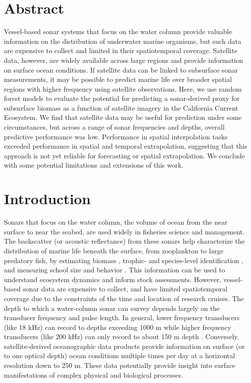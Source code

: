 \documentclass[10pt,letterpaper]{article}
\begin{document}
\section*{Abstract}
Vessel-based sonar systems that focus on the water column provide valuable information on the distribution of underwater marine organisms, but such data are expensive to collect and limited in their spatiotemporal coverage.
Satellite data, however, are widely available across large regions and provide information on surface ocean conditions.
If satellite data can be linked to subsurface sonar measurements, it may be possible to predict marine life over broader spatial regions with higher frequency using satellite observations.
Here, we use random forest models to evaluate the potential for predicting a sonar-derived proxy for subsurface biomass as a function of satellite imagery in the California Current Ecosystem.
We find that satellite data may be useful for prediction under some circumstances, but across a range of sonar frequencies and depths, overall predictive performance was low.
Performance in spatial interpolation tasks exceeded performance in spatial and temporal extrapolation, suggesting that this approach is not yet reliable for forecasting or spatial extrapolation.
We conclude with some potential limitations and extensions of this work.

\linenumbers

\section*{Introduction}

Sonars that focus on the water column, the volume of ocean from the near surface to near the seabed, are used widely in fisheries science and management.
The backscatter (or acoustic reflectance) from these sonars help characterize the distribution of marine life beneath the surface, from zooplankton to large predatory fish, by estimating biomass \cite{davison2015acoustic}, trophic- and species-level identification \cite{benoit2001target, trenkel2013fisheries}, and measuring school size and behavior \cite{towler2003visualizing, kaartvedt2009use, jech2012aggregative}.
This information can be used to understand ecosystem dynamics and inform stock assessments.
However, vessel-based sonar data are expensive to collect, and have limited spatiotemporal coverage due to the constraints of the time and location of research cruises.
The depth to which a water-column sonar can survey depends largely on the transducer frequency and pulse length.
In general, lower frequency transducers (like 18 kHz) can record to depths exceeding 1000 m while higher frequency transducers (like 200 kHz) can only record to about 150 m depth \cite{simmonds2008fisheries}.
Conversely, satellite-derived oceanographic data products provide information on surface (or to one optical depth) ocean conditions multiple times per day at a horizontal resolution down to 250 m.
These data potentially provide insight into surface manifestations of complex physical and biological processes.
\end{document}
